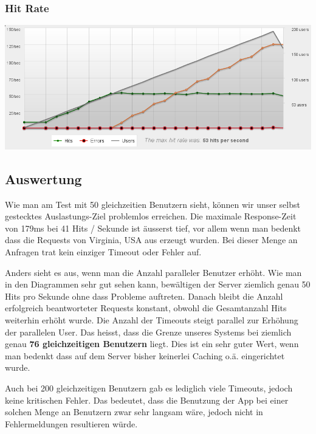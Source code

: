 \documentclass[10pt,a4paper]{scrartcl}
\begin{document}
\subsubsection*{Hit Rate}

\includegraphics[width=\textwidth]{loadtests/hitrate-200.png}


\subsection{Auswertung}

Wie man am Test mit 50 gleichzeitien Benutzern sieht, können wir unser selbst gestecktes Auslastungs-Ziel
problemlos erreichen. Die maximale Response-Zeit von 179ms bei 41 Hits / Sekunde ist äusserst tief,
vor allem wenn man bedenkt dass die Requests von Virginia, USA aus erzeugt wurden. Bei dieser Menge
an Anfragen trat kein einziger Timeout oder Fehler auf.

Anders sieht es aus, wenn man die Anzahl paralleler Benutzer erhöht. Wie man in den Diagrammen sehr
gut sehen kann, bewältigen der Server ziemlich genau 50 Hits pro Sekunde ohne dass Probleme auftreten. 
Danach bleibt die Anzahl erfolgreich beantworteter Requests konstant, obwohl die Gesamtanzahl Hits weiterhin erhöht
wurde. Die Anzahl der Timeouts steigt parallel zur Erhöhung der parallelen User. Das heisst, dass
die Grenze unseres Systems bei ziemlich genau \textbf{76 gleichzeitigen Benutzern} liegt. Dies ist
ein sehr guter Wert, wenn man bedenkt dass auf dem Server bisher keinerlei Caching o.ä. eingerichtet
wurde.

Auch bei 200 gleichzeitigen Benutzern gab es lediglich viele Timeouts, jedoch keine kritischen
Fehler. Das bedeutet, dass die Benutzung der App bei einer solchen Menge an Benutzern zwar sehr
langsam wäre, jedoch nicht in Fehlermeldungen resultieren würde.
\end{document}
